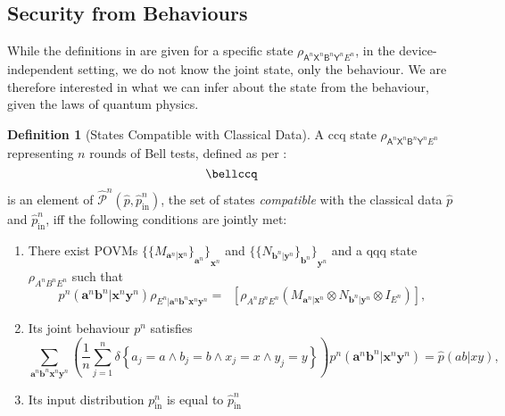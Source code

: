 \documentclass[10pt, a4paper]{article}
\numberwithin{equation}{section} %
\newcounter{stmt} %
\theoremstyle{definition}
\newtheorem{defn}[stmt]{Definition}
\theoremstyle{plain}
\newcommand{\?}{\mathrel{?}} %
\newcommand{\cvec}[1]{\boldsymbol{\mathbf{#1}}}    %
\newcommand{\indic}[1]{\delta{\left\{#1\right\}}} %
\newcommand{\Tr}[2][]{\mathop{\mathrm{Tr}#1}\left[ #2 \right]} %
\newcommand{\crv}[1]{\mathsf{#1}}
\newcommand{\compatstates}[3][]{\hat{\mathcal{P}}#1(#2,#3)}
\newcommand{\prin}[1][p]{#1_{\mathrm{in}}}
\begin{document}
  \subsection{Security from Behaviours}\label{sec:diqkd_behavsec}

    While the definitions in  are given for a specific state \(\rho_{\crv{A}^n\crv{X}^n \crv{B}^n\crv{Y}^n E^n}\), in the device-independent setting, we do not know the joint state, only the behaviour. We are therefore interested in what we can infer about the state from the behaviour, given the laws of quantum physics.

    \begin{defn}[States Compatible with Classical Data]
    A ccq state \(\rho_{\crv{A}^n\crv{X}^n \crv{B}^n\crv{Y}^n E^n}\) representing \(n\) rounds of Bell tests, defined as per :
    \begin{equation}
      \bellccq
    \end{equation}
  is an element of \(\compatstates[^n]{\hat{p}}{\prin[\hat{p}^n]}\), the set of states \emph{compatible} with the classical data \(\hat{p}\) and \(\prin[\hat{p}^n]\), iff the following conditions are jointly met:
      \begin{enumerate}
        \item There exist POVMs \({\{ {\{ M_{\cvec{a}^n|\cvec{x}^n}\}}_{\cvec{a}^n} \}}_{\cvec{x}^n}\) and \({\{ {\{ N_{\cvec{b}^n|\cvec{y}^n}\}}_{\cvec{b}^n} \}}_{\cvec{y}^n}\) and a qqq state \(\rho_{A^n B^n E^n}\) such that
        \begin{equation}\label{eqn:probmeas}
          p^n(\cvec{a}^n\cvec{b}^n|\cvec{x}^n\cvec{y}^n) \rho_{E^n|\cvec{a}^n\cvec{b}^n \cvec{x}^n\cvec{y}^n} = \Tr[_{A^n B^n}]{\rho_{A^n B^n E^n} \left(M_{\cvec{a}^n|\cvec{x}^n} \otimes N_{\cvec{b}^n|\cvec{y}^n} \otimes I_{E^n}\right) },
        \end{equation}
        \item Its joint behaviour \(p^n\) satisfies
      \begin{equation}
        \sum_{\cvec{a}^n\cvec{b}^n \cvec{x}^n\cvec{y}^n} \left( \frac{1}{n} \sum_{j=1}^n \indic{a_j = a \land b_j = b \land x_j = x \land y_j = y} \right) p^n(\cvec{a}^n\cvec{b}^n|\cvec{x}^n\cvec{y}^n) = \hat{p}(ab|xy),
      \end{equation}
      \item Its input distribution \(\prin^n\) is equal to \(\prin[\hat{p}^n]\)
  \end{enumerate}
    \end{defn}
\end{document}
